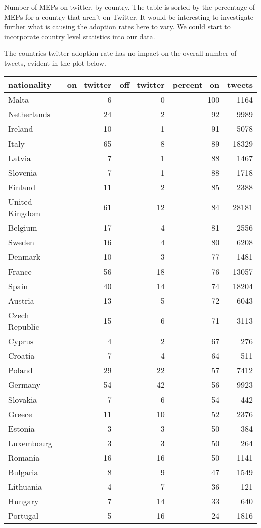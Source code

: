 \documentclass{article}\usepackage[]{graphicx}\usepackage[]{color}
\begin{document}
Number of MEPs on twitter, by country. The table is sorted by the percentage of MEPs for a country that aren't on Twitter. It would be interesting to investigate further what is causing the adoption rates here to vary. We could start to incorporate country level statistics into our data.

The countries twitter adoption rate has no impact on the overall number of tweets, evident in the plot below.

\begin{table}[ht]
\centering
\begin{tabular}{lrrrr}
  \hline
nationality & on\_twitter & off\_twitter & percent\_on & tweets \\ 
  \hline
Malta & 6 & 0 & 100 & 1164 \\ 
  Netherlands & 24 & 2 & 92 & 9989 \\ 
  Ireland & 10 & 1 & 91 & 5078 \\ 
  Italy & 65 & 8 & 89 & 18329 \\ 
  Latvia & 7 & 1 & 88 & 1467 \\ 
  Slovenia & 7 & 1 & 88 & 1718 \\ 
  Finland & 11 & 2 & 85 & 2388 \\ 
  United Kingdom & 61 & 12 & 84 & 28181 \\ 
  Belgium & 17 & 4 & 81 & 2556 \\ 
  Sweden & 16 & 4 & 80 & 6208 \\ 
  Denmark & 10 & 3 & 77 & 1481 \\ 
  France & 56 & 18 & 76 & 13057 \\ 
  Spain & 40 & 14 & 74 & 18204 \\ 
  Austria & 13 & 5 & 72 & 6043 \\ 
  Czech Republic & 15 & 6 & 71 & 3113 \\ 
  Cyprus & 4 & 2 & 67 & 276 \\ 
  Croatia & 7 & 4 & 64 & 511 \\ 
  Poland & 29 & 22 & 57 & 7412 \\ 
  Germany & 54 & 42 & 56 & 9923 \\ 
  Slovakia & 7 & 6 & 54 & 442 \\ 
  Greece & 11 & 10 & 52 & 2376 \\ 
  Estonia & 3 & 3 & 50 & 384 \\ 
  Luxembourg & 3 & 3 & 50 & 264 \\ 
  Romania & 16 & 16 & 50 & 1141 \\ 
  Bulgaria & 8 & 9 & 47 & 1549 \\ 
  Lithuania & 4 & 7 & 36 & 121 \\ 
  Hungary & 7 & 14 & 33 & 640 \\ 
  Portugal & 5 & 16 & 24 & 1816 \\ 
   \hline
\end{tabular}
\end{table}
\end{document}
